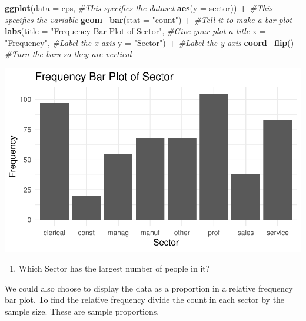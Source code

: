 \documentclass[
]{report}
\newenvironment{Shaded}{\begin{snugshade}}{\end{snugshade}}
\newcommand{\CommentTok}[1]{\textcolor[rgb]{0.56,0.35,0.01}{\textit{#1}}}
\newcommand{\DataTypeTok}[1]{\textcolor[rgb]{0.13,0.29,0.53}{#1}}
\newcommand{\KeywordTok}[1]{\textcolor[rgb]{0.13,0.29,0.53}{\textbf{#1}}}
\newcommand{\NormalTok}[1]{#1}
\newcommand{\OperatorTok}[1]{\textcolor[rgb]{0.81,0.36,0.00}{\textbf{#1}}}
\newcommand{\StringTok}[1]{\textcolor[rgb]{0.31,0.60,0.02}{#1}}
\providecommand{\tightlist}{%
  \setlength{\itemsep}{0pt}\setlength{\parskip}{0pt}}
\begin{document}
\begin{Shaded}
\begin{Highlighting}[]
\KeywordTok{ggplot}\NormalTok{(}\DataTypeTok{data =}\NormalTok{ cps,   }\CommentTok{#This specifies the dataset}
       \KeywordTok{aes}\NormalTok{(}\DataTypeTok{y =}\NormalTok{ sector)) }\OperatorTok{+}\StringTok{   }\CommentTok{#This specifies the variable}
\StringTok{  }\KeywordTok{geom_bar}\NormalTok{(}\DataTypeTok{stat =} \StringTok{"count"}\NormalTok{) }\OperatorTok{+}\StringTok{  }\CommentTok{#Tell it to make a bar plot}
\StringTok{  }\KeywordTok{labs}\NormalTok{(}\DataTypeTok{title =} \StringTok{"Frequency Bar Plot of Sector"}\NormalTok{,  }\CommentTok{#Give your plot a title}
       \DataTypeTok{x =} \StringTok{"Frequency"}\NormalTok{,   }\CommentTok{#Label the x axis}
       \DataTypeTok{y =} \StringTok{"Sector"}\NormalTok{)  }\OperatorTok{+}\StringTok{ }\CommentTok{#Label the y axis}
\StringTok{  }\KeywordTok{coord_flip}\NormalTok{()  }\CommentTok{#Turn the bars so they are vertical}
\end{Highlighting}
\end{Shaded}

\begin{center}\includegraphics[width=0.5\linewidth]{03-EDA-categorical_files/figure-latex/unnamed-chunk-3-1} \end{center}

\begin{enumerate}
\def\labelenumi{\arabic{enumi}.}
\setcounter{enumi}{3}
\tightlist
\item
  Which Sector has the largest number of people in it?
\end{enumerate}

\vspace{0.3in}

We could also choose to display the data as a proportion in a relative frequency bar plot. To find the relative frequency divide the count in each sector by the sample size. These are sample proportions.
\end{document}
